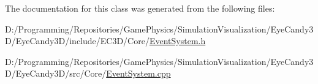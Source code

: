 The documentation for this class was generated from the following files\+:\begin{DoxyCompactItemize}
\item 
D\+:/\+Programming/\+Repositories/\+Game\+Physics/\+Simulation\+Visualization/\+Eye\+Candy3\+D/\+Eye\+Candy3\+D/include/\+E\+C3\+D/\+Core/\mbox{\hyperlink{_event_system_8h}{Event\+System.\+h}}\item 
D\+:/\+Programming/\+Repositories/\+Game\+Physics/\+Simulation\+Visualization/\+Eye\+Candy3\+D/\+Eye\+Candy3\+D/src/\+Core/\mbox{\hyperlink{_event_system_8cpp}{Event\+System.\+cpp}}\end{DoxyCompactItemize}
